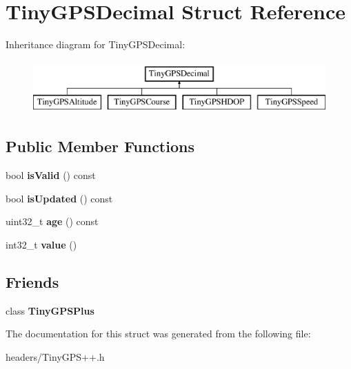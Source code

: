 \hypertarget{struct_tiny_g_p_s_decimal}{}\section{Tiny\+G\+P\+S\+Decimal Struct Reference}
\label{struct_tiny_g_p_s_decimal}
Inheritance diagram for Tiny\+G\+P\+S\+Decimal\+:\begin{figure}[H]
\begin{center}
\leavevmode
\includegraphics[height=2.000000cm]{struct_tiny_g_p_s_decimal}
\end{center}
\end{figure}
\subsection*{Public Member Functions}
\begin{DoxyCompactItemize}
\item 
bool {\bfseries is\+Valid} () const \hypertarget{struct_tiny_g_p_s_decimal_a2a1d868525e903eb193b7a36cdd76984}{}\label{struct_tiny_g_p_s_decimal_a2a1d868525e903eb193b7a36cdd76984}

\item 
bool {\bfseries is\+Updated} () const \hypertarget{struct_tiny_g_p_s_decimal_ae8b7f9f7719c2974ebd3b34759493d15}{}\label{struct_tiny_g_p_s_decimal_ae8b7f9f7719c2974ebd3b34759493d15}

\item 
uint32\+\_\+t {\bfseries age} () const \hypertarget{struct_tiny_g_p_s_decimal_ab80191a3e02c92ad3f674b5df2ab752f}{}\label{struct_tiny_g_p_s_decimal_ab80191a3e02c92ad3f674b5df2ab752f}

\item 
int32\+\_\+t {\bfseries value} ()\hypertarget{struct_tiny_g_p_s_decimal_ac3ce80976e5d8456e9f211b910a6cb19}{}\label{struct_tiny_g_p_s_decimal_ac3ce80976e5d8456e9f211b910a6cb19}

\end{DoxyCompactItemize}
\subsection*{Friends}
\begin{DoxyCompactItemize}
\item 
class {\bfseries Tiny\+G\+P\+S\+Plus}\hypertarget{struct_tiny_g_p_s_decimal_a6501fd5ef19ae166d43e0e5781609ee2}{}\label{struct_tiny_g_p_s_decimal_a6501fd5ef19ae166d43e0e5781609ee2}

\end{DoxyCompactItemize}


The documentation for this struct was generated from the following file\+:\begin{DoxyCompactItemize}
\item 
headers/Tiny\+G\+P\+S++.\+h\end{DoxyCompactItemize}
